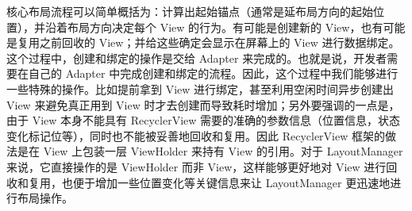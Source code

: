 核心布局流程可以简单概括为：计算出起始锚点（通常是延布局方向的起始位置），并沿着布局方向决定每个 View 的行为。有可能是创建新的 View，也有可能是复用之前回收的 View；并给这些确定会显示在屏幕上的 View 进行数据绑定。这个过程中，创建和绑定的操作是交给 Adapter 来完成的。也就是说，开发者需要在自己的 Adapter 中完成创建和绑定的流程。因此，这个过程中我们能够进行一些特殊的操作。比如提前拿到 View 进行绑定，甚至利用空闲时间异步创建出 View 来避免真正用到 View 时才去创建而导致耗时增加；另外要强调的一点是，由于 View 本身不能具有 RecyclerView 需要的准确的参数信息（位置信息，状态变化标记位等），同时也不能被妥善地回收和复用。因此 RecyclerView 框架的做法是在 View 上包装一层 ViewHolder 来持有 View 的引用。对于 LayoutManager 来说，它直接操作的是 ViewHolder 而非 View，这样能够更好地对 View 进行回收和复用，也便于增加一些位置变化等关键信息来让 LayoutManager 更迅速地进行布局操作。




